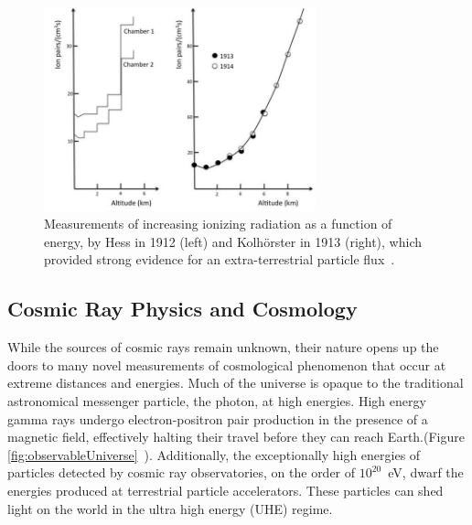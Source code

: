\begin{figure}
\centering
	\includegraphics[width=0.7\textwidth]{figures/HessKol}
	\caption{Measurements of increasing ionizing radiation as a function of energy, by Hess in 1912 (left) and Kolhörster in 1913 (right), which provided strong evidence for an extra-terrestrial particle flux~\cite{HessKolPic}. }
\label{fig:HessKol}
\end{figure}
	
	\subsection{Cosmic Ray Physics and Cosmology}
	While the sources of cosmic rays remain unknown, their nature opens up the doors to many novel measurements of cosmological phenomenon that occur at extreme distances and energies.  Much of the universe is opaque to the traditional astronomical messenger particle, the photon, at high energies.  High energy gamma rays undergo electron-positron pair production in the presence of a magnetic field, effectively halting their travel before they can reach Earth.(Figure \ref{fig:observableUniverse}~\cite{RevModPhys.41.581}).  Additionally, the exceptionally high energies of particles detected by cosmic ray observatories, on the order of $10^{20}$~eV, dwarf the energies produced at terrestrial particle accelerators.  These particles can shed light on the world in the ultra high energy (UHE) regime.

